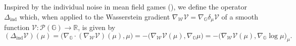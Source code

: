 \documentclass[10pt]{article}
\numberwithin{equation}{section}
\newcommand{\cP}{ \mathcal{P}}
\newcommand{\cV}{ \mathcal{V}}
\newcommand{\cW}{ \mathcal{W}}
\newcommand{\mW}{ \mathcal{W}}
\newcommand{\mP}{ \mathcal{P}}
\newcommand{\bG}{\mathbb G}
\newcommand{\bR}{\mathbb R}
\newcommand{\R}{\mathbb R}
\def\R{{\mathbb{R}}}
\begin{document}
Inspired by the individual noise in mean field games (\cite{ChowGan, GangboM22, GangboMMZ22}), we define the operator $\Delta_\text{ind}$ which, when applied to the Wasserstein gradient $\nabla_{\mW}\mathcal{V} = \nabla_\mathbb{G}\delta_\mu\mathcal{V}$ of a smooth function $\cV: \cP(\bG) \to \bR$, is given by
\begin{equation}\label{eq:sep06.2025.2}
(\Delta_\text{ind} \cV)(\mu)= \big(\nabla_\bG\cdot (\nabla_{\cW}\cV)(\mu), \mu\big)=-\big(\nabla_{\cW}\cV(\mu), \nabla_\bG \mu\big)=-\big(\nabla_{\cW}\cV(\mu), \nabla_\bG \log \mu\big)_\mu.
\end{equation}


%
%
%				
%
\end{document}
